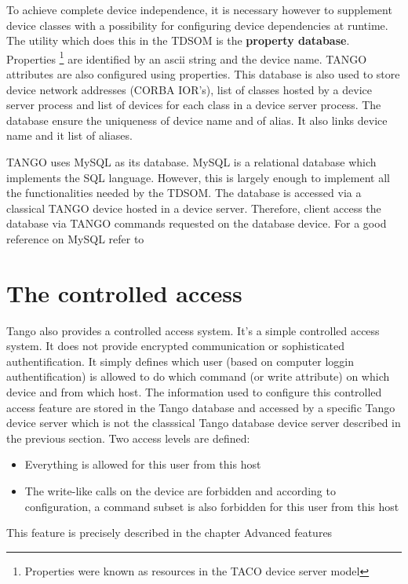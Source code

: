 To achieve complete device independence, it is necessary however to
supplement device classes with a possibility for configuring device
dependencies at runtime. The utility which does this in the TDSOM
is the \textbf{property database}. Properties%
\footnote{Properties were known as resources in the TACO device server model%
} are identified by an ascii string and the device name. TANGO attributes
are also configured using properties. This database
is also used to store device network addresses (CORBA IOR's),
list of classes hosted by a device server process and list of devices
for each class in a device server process. The database ensure the
uniqueness of device name and of alias. It also links device name
and it list of aliases.

TANGO uses MySQL\cite{mysql} as its database. MySQL
is a relational database which implements the SQL language. However,
this is largely enough to implement all the functionalities needed
by the TDSOM. The database is accessed via a classical TANGO device
hosted in a device server. Therefore, client access the database via
TANGO commands requested on the database device. For a good reference
on MySQL refer to \cite{MySQL book}


\section{The controlled access}

Tango also provides a controlled access
system. It's a simple controlled access system. It does not provide
encrypted communication or sophisticated authentification. It simply
defines which user (based on computer loggin authentification) is
allowed to do which command (or write attribute) on which device and
from which host. The information used to configure this controlled
access feature are stored in the Tango database and accessed by a
specific Tango device server which is not the classsical Tango database
device server described in the previous section. Two access levels
are defined:
\begin{itemize}
\item Everything is allowed for this user from this host
\item The write-like calls on the device are forbidden and according to
configuration, a command subset is also forbidden for this user from
this host
\end{itemize}
This feature is precisely described in the chapter \textquotedbl{}Advanced
features\textquotedbl{}



